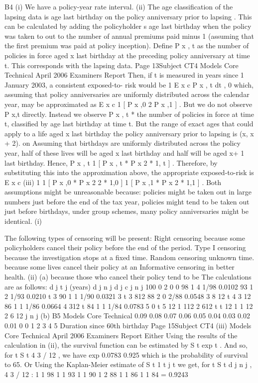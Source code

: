 \documentclass[a4paper,12pt]{article}
\begin{document}
B4
(i) We have a policy-year rate interval.
(ii) The age classification of the lapsing data is age last birthday on the policy
anniversary prior to lapsing .
This can be calculated by adding the policyholder s age last birthday when the
policy was taken to out to the number of annual premiums paid minus 1
(assuming that the first premium was paid at policy inception).
Define P x , t as the number of policies in force aged x last birthday at the
preceding policy anniversary at time t. This corresponds with the lapsing
data.
Page 13Subject CT4
Models Core Technical
April 2006
Examiners Report
Then, if t is measured in years since 1 January 2003, a consistent exposed-to-
risk would be
1
E x c
P x , t dt ,
0
which, assuming that policy anniversaries are uniformly distributed across the
calendar year,
may be approximated as
E x c
1
[ P x ,0
2
P x ,1 ] .
But we do not observe P x,t directly. Instead we observe P x , t * the number of
policies in force at time t, classified by age last birthday at time t.
But the range of exact ages that could apply to a life aged x last birthday
the policy anniversary prior to lapsing is (x, x + 2).
on
Assuming that birthdays are uniformly distributed across the policy year, half
of these lives will be aged x last birthday and half will be aged x+ 1 last
birthday.
Hence,
P x , t
1
[ P x , t * P x
2
*
1, t
] .
Therefore, by substituting this into the approximation above, the appropriate
exposed-to-risk is
E x c
(iii)
1 1
[ P x ,0 * P x
2 2
*
1,0 ]
1
[ P x ,1 * P x
2
*
1,1 ]
.
Both assumptions might be unreasonable because:
policies might be taken out in large numbers just before the end of the tax
year,
policies might tend to be taken out just before birthdays,
under group schemes, many policy anniversaries might be identical.
(i)

The following types of censoring will be present:
Right censoring because some policyholders cancel their policy before
the end of the period.
Type I censoring
because the investigation stops at a fixed time.
Random censoring
unknown time.
because some lives cancel their policy at an
Informative censoring
in better health.
(ii)
(a)
because those who cancel their policy tend to be
The calculations are as follows:
d j
t j
(years)
d j
n j d j c j n j 100 0 2 0 0
98 1 4 1/98 0.0102
93 1 2 1/93 0.0210
t 3 90 1 1 1/90 0.0321
3 t 3 812 88 2 0 2/88 0.0548
3 8 12 t 4 3 12 86 1 1 1/86 0.0664
4 312 t 84 1 1 1/84 0.0783
5
0 t
5
12
1 112
2 612
t
t
12
1 1 12
2 6 12
j
n j
(b)
B5
Models Core Technical
0.09
0.08
0.07
0.06
0.05
0.04
0.03
0.02
0.01
0
0
1
2
3
4
5
Duration since 60th birthday
Page 15Subject CT4
(iii)
Models Core Technical
April 2006
Examiners Report
Either
Using the results of the calculation in (ii), the survival function can be
estimated by S t exp
t .
And so, for t
S t
4 3 / 12 , we have
exp
0.0783
0.925
which is the probability of survival to 65.
Or
Using the Kaplan-Meier estimate of S t
1
t j t
we get, for t
S t
d j
n j
,
4 3 / 12 :
1
1
98
1
1
93
1
1
90
1
2
88
1
1
86
1
1
84
= 0.9243
\end{document}
